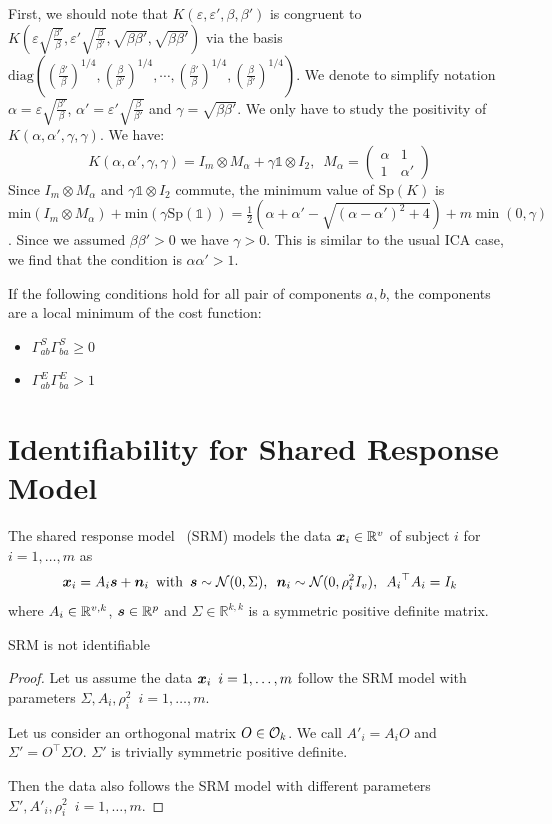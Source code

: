 First, we should note that $K(\varepsilon, \varepsilon', \beta, \beta') $ is congruent to $K(\varepsilon \sqrt{\frac{\beta'}{\beta}}, \varepsilon' \sqrt{\frac{\beta}{\beta'}}, \sqrt{\beta\beta'}, \sqrt{\beta\beta'})$ via the basis $\text{diag}((\frac{\beta'}{\beta})^{1/4}, (\frac{\beta}{\beta'})^{1/4}, \cdots,(\frac{\beta'}{\beta})^{1/4}, (\frac{\beta}{\beta'})^{1/4})$.
%
We denote to simplify notation $\alpha = \varepsilon \sqrt{\frac{\beta'}{\beta}}$, $\alpha' = \varepsilon' \sqrt{\frac{\beta}{\beta'}}$ and $\gamma = \sqrt{\beta\beta'}$. We only have to study the positivity of $K(\alpha, \alpha', \gamma, \gamma)$.
We have:
$$
K(\alpha, \alpha', \gamma, \gamma) =  I_m  \otimes M_\alpha+ \gamma  \mathbb{1}\otimes I_2, \enspace M_\alpha = 
\begin{pmatrix}
\alpha & 1 \\
1 & \alpha'
\end{pmatrix}
$$
Since $I_m\otimes M_\alpha$ and $\gamma \mathbb{1}\otimes I_2$ commute, the minimum value of $\text{Sp}(K)$ is $\text{min}(I_m\otimes M_\alpha) + \text{min}(\gamma\text{Sp}(\mathbb{1}))=\frac12(\alpha + \alpha' - \sqrt{(\alpha - \alpha')^2 + 4}) + m\min(0, \gamma)$.
Since we assumed $\beta \beta' > 0$ we have $\gamma > 0$. This is similar to the usual ICA case, we find that the condition is $\alpha\alpha' > 1$.

If the following conditions hold for all pair of components $a, b$, the components are a local minimum of the cost function:
\begin{itemize}
    \item $\Gamma^S_{ab}\Gamma^S_{ba}\geq 0$
    \item $\Gamma^E_{ab}\Gamma^E_{ba} > 1$
\end{itemize}
\section{Identifiability for Shared Response Model}
\label{sec:app_identifiability}
The shared response model~\cite{chen2015reduced} (SRM) models the data $\boldsymbol{x}_i \in \mathbb{R}^v$ of subject $i$ for $i = 1,\dots, m$ as
\begin{align*}
    \boldsymbol{x}_i = A_i \boldsymbol{s} + \boldsymbol{n}_i \enspace \text{with} \enspace \boldsymbol{s} \sim \mathcal{N}(0, \Sigma), \enspace\boldsymbol{n}_i \sim \mathcal{N}(0, \rho_i^2 I_v), \enspace {A_i}^{\top}A_i = I_k
\end{align*}
where $A_i \in \mathbb{R}^{v, k}$, $\boldsymbol{s} \in \mathbb{R}^p$ and  $\Sigma \in \mathbb{R}^{k, k}$ is a symmetric positive definite matrix.

\begin{proposition}
SRM is not identifiable
\end{proposition}
\begin{proof}
Let us assume the data $\boldsymbol{x}_i \enspace i=1, \dots, m$ follow the SRM model with parameters $\Sigma, A_i, \rho_i^2 \enspace i=1, \dots, m$. 

Let us consider an orthogonal matrix $O \in \mathcal{O}_k$.
We call $A'_i = A_i O$ and $\Sigma' = O^{\top} \Sigma O$. 
$\Sigma'$ is trivially symmetric positive definite.

Then the data also follows the SRM model with different parameters $\Sigma', A'_i, \rho_i^2 \enspace i=1, \dots, m$.
\end{proof}

